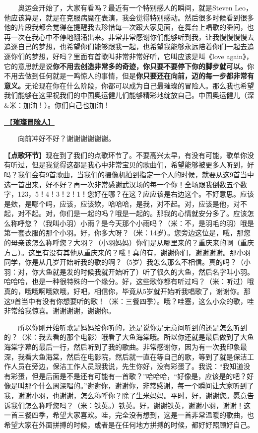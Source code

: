 \documentclass[]{ctexbook}
\begin{document}
  奥运会开始了，大家有看吗？最近有一个特别感人的瞬间，就是Steven Leo，他应该算是，就是在克服病魔在表演，我会觉得特别感动。然后很多时候看到很多他的片段我都会觉得在提醒我去珍惜每一次跟大家见面，在舞台上唱歌的瞬间，也再一次在我心中不停地翻涌出来。非常非常感谢你们能够听到我，让我慢慢慢慢去追逐自己的梦想，也希望你们能够跟我一起，也希望我能够永远陪着你们一起去追逐你们的梦想，好吗？里面有首歌叫非常非常好听，它叫应该是叫《love again》，它的意思就是说\textbf{你不用去创造非常多的奇迹，你只要不要停下你的脚步就可以。}你不用去做到任何就是一鸣惊人的事情，但是\textbf{你只要还在向前，迈的每一步都非常有意义。}无论现在你在什么阶段，你都可以成为自己最璀璨的冒险人。那么我也希望我们能够在这里祝我们的中国奥运健儿们能够精彩地绽放自己。中国奥运健儿（深\&米：加油！）。你们自己也加油！

\hyperref[adventurers]{🎵【\textbf{璀璨冒险人}】}

  向前冲好不好？谢谢谢谢谢谢。

【\textbf{点歌环节}】现在到了我们的点歌环节了。不要高兴太早，有没有可能，歌单你没有听过，但是我觉得这都是我心中非常宝贝的歌曲们，希望能够被更多人听到，好吗？我们会有9首歌曲，当我们的摄像机拍到指定一个人的时候，就要从这9首当中选一首出来，好不好？再一次非常感谢武汉场的每一个你！全场跟我倒数五个数字，123，5！4！3！2！1！您好在哪？在这？应应该是右边这个。不好意思。应该是欸，是哪个吗，应该，应该欸，哈哈哈，是我，对不起。对，应该是他，对不起，对不起。对，你们是一起的吗？哦是一起的。那我的心情就安分多了。应该怎么称呼您？（我叫小羽）小雨？是今天那个小雨吗？（米：不，是羽毛的羽）哦是第一套衣服的那个小羽。好，你多大呀？（米：14岁）。您旁边这位是，哦，那您的母亲该怎么称呼您？大羽？（小羽妈妈）你们是从哪里来的？重庆来的啊（重庆方言）。这里有没有其他从重庆来的？哦！真的有，谢谢你们，谢谢谢谢。那小羽同学，你是从几岁开始听我的歌的啊？（5岁）我怎么那么不相信。真的吗？（小羽：对，你大鱼就是发的时候我就开始听了）听了很久的大鱼，然后名字叫小羽。哈哈哈，也是一种很特殊的一个缘分。好，这些歌你都有听过吗？（米：听过）哦真的，哦哦啊哦欸哦，好吧，相信你，毕竟从5岁就开始听我唱歌了，谢谢你。那这9首当中有没有你想要听的歌！（米：三餐四季）。哦？哇塞，这么小众的歌，哇非常给我惊喜。谢谢谢谢，谢谢你。

  所以你刚开始听歌是妈妈给你听的，还是说你是无意间听到的还是怎么听到的？（米：我去看的那个电影）哦看了大鱼海棠哦。所以你还就是最后做到了大鱼海棠字幕的最后一行，然后听到了我的歌曲。非常感谢你，因为有一次我印象最深，我看大鱼海棠，然后在电影院，然后就一直在等自己的歌，等到了就是保洁工作人员在旁边，保洁工作人员跟我说，先生你好，没有彩蛋了。我说：``我知道没有彩蛋，但是后面是不是还有可能有一首歌？''哈哈哈，``好像是，应该是的吧？好像是叫那个什么周深唱的。''谢谢你，谢谢你，非常感谢，每一个瞬间让大家听到了我，谢谢小羽，也谢谢，怎么称呼你？除了生米妈妈。平时，好，谢谢您。愿意告诉我们怎么称呼您吗？（米：铁英。）铁英。好，谢谢铁英，谢谢小羽，谢谢！这一首三餐四季，希望大家喜欢。哇，完全没有想到，这是一首非常温暖的歌曲，也希望大家在外面拼搏的时候，或者是在任何地方拼搏的时候，都好好照顾好自己。
\end{document}
